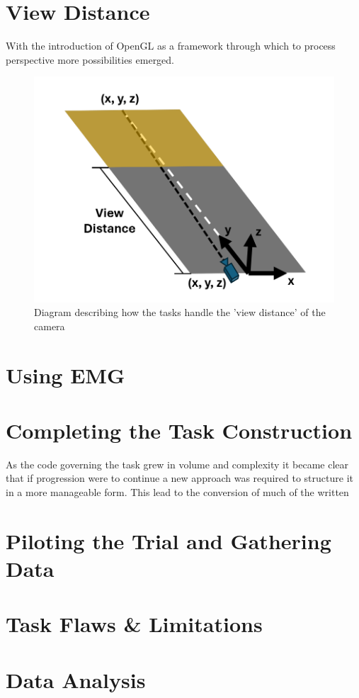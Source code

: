 \section{View Distance}
With the introduction of OpenGL as a framework through which to process perspective more possibilities emerged.
\begin{figure}[hbt!]
    \centering
    \includegraphics[width=0.45\linewidth]{figures/Camera Viewing.png}
    \caption{Diagram describing how the tasks handle the 'view distance' of the camera}
    \label{fig:ViewDist}
\end{figure}

\section{Using EMG}

\section{Completing the Task Construction}
As the code governing the task grew in volume and complexity it became clear that if progression were to continue a new approach was required to structure it in a more manageable form. This lead to the conversion of much of the written 
\section{Piloting the Trial and Gathering Data}

\section{Task Flaws \& Limitations}

\section{Data Analysis}